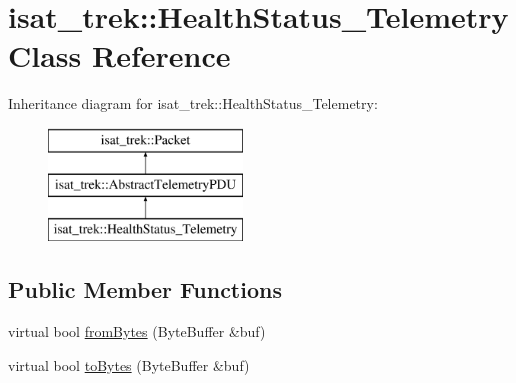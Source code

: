 \hypertarget{classisat__trek_1_1_health_status___telemetry}{}\section{isat\+\_\+trek\+:\+:Health\+Status\+\_\+\+Telemetry Class Reference}
\label{classisat__trek_1_1_health_status___telemetry}
Inheritance diagram for isat\+\_\+trek\+:\+:Health\+Status\+\_\+\+Telemetry\+:\begin{figure}[H]
\begin{center}
\leavevmode
\includegraphics[height=3.000000cm]{classisat__trek_1_1_health_status___telemetry}
\end{center}
\end{figure}
\subsection*{Public Member Functions}
\begin{DoxyCompactItemize}
\item 
virtual bool \hyperlink{classisat__trek_1_1_health_status___telemetry_a119eeb6f855a7825556d519d71f31574}{from\+Bytes} (Byte\+Buffer \&buf)
\item 
virtual bool \hyperlink{classisat__trek_1_1_health_status___telemetry_ae662d21441cd159c9d31b2c8016126e4}{to\+Bytes} (Byte\+Buffer \&buf)
\end{DoxyCompactItemize}
